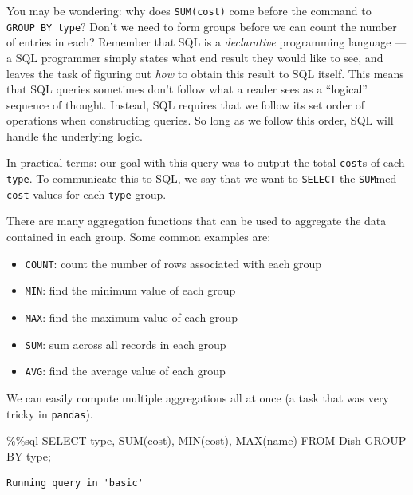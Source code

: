 \documentclass[
  letterpaper,
  DIV=11,
  numbers=noendperiod]{scrreprt}
\newenvironment{Shaded}{\begin{snugshade}}{\end{snugshade}}
\newcommand{\BuiltInTok}[1]{\textcolor[rgb]{0.00,0.23,0.31}{#1}}
\newcommand{\NormalTok}[1]{\textcolor[rgb]{0.00,0.23,0.31}{#1}}
\newcommand{\OperatorTok}[1]{\textcolor[rgb]{0.37,0.37,0.37}{#1}}
\providecommand{\tightlist}{%
  \setlength{\itemsep}{0pt}\setlength{\parskip}{0pt}}\usepackage{longtable,booktabs,array}
\begin{document}
You may be wondering: why does \texttt{SUM(cost)} come before the
command to \texttt{GROUP\ BY\ type}? Don't we need to form groups before
we can count the number of entries in each? Remember that SQL is a
\emph{declarative} programming language --- a SQL programmer simply
states what end result they would like to see, and leaves the task of
figuring out \emph{how} to obtain this result to SQL itself. This means
that SQL queries sometimes don't follow what a reader sees as a
``logical'' sequence of thought. Instead, SQL requires that we follow
its set order of operations when constructing queries. So long as we
follow this order, SQL will handle the underlying logic.

In practical terms: our goal with this query was to output the total
\texttt{cost}s of each \texttt{type}. To communicate this to SQL, we say
that we want to \texttt{SELECT} the \texttt{SUM}med \texttt{cost} values
for each \texttt{type} group.

There are many aggregation functions that can be used to aggregate the
data contained in each group. Some common examples are:

\begin{itemize}
\tightlist
\item
  \texttt{COUNT}: count the number of rows associated with each group
\item
  \texttt{MIN}: find the minimum value of each group
\item
  \texttt{MAX}: find the maximum value of each group
\item
  \texttt{SUM}: sum across all records in each group
\item
  \texttt{AVG}: find the average value of each group
\end{itemize}

We can easily compute multiple aggregations all at once (a task that was
very tricky in \texttt{pandas}).

\begin{Shaded}
\begin{Highlighting}[]
\OperatorTok{\%\%}\NormalTok{sql}
\NormalTok{SELECT }\BuiltInTok{type}\NormalTok{, SUM(cost), MIN(cost), MAX(name)}
\NormalTok{FROM Dish}
\NormalTok{GROUP BY }\BuiltInTok{type}\OperatorTok{;}
\end{Highlighting}
\end{Shaded}

\begin{verbatim}
Running query in 'basic'
\end{verbatim}
\end{document}
